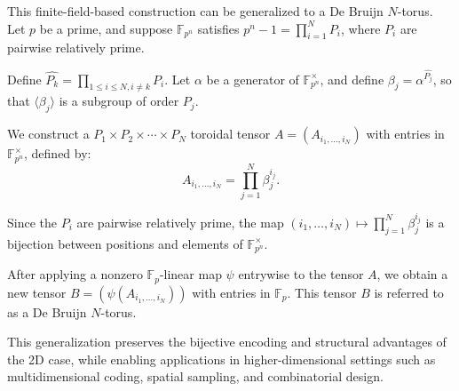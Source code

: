 \documentclass{article}
\begin{document}
This finite-field-based construction can be generalized to a De Bruijn $N$-torus. Let $p$ be a prime, and suppose $\mathbb{F}_{p^n}$ satisfies $p^n - 1 = \prod^{N}_{i=1} P_{i}$, where $P_{i}$ are pairwise relatively prime.

Define $\hat{P_k} = \prod_{1 \le i \le N, i \ne k} P_i$. Let $\alpha$ be a generator of $\mathbb{F}_{p^n}^\times$, and define $\beta_j = \alpha^{\hat{P_j}}$, so that $\langle \beta_j \rangle$ is a subgroup of order $P_j$.

We construct a $P_1 \times P_2 \times \cdots \times P_N$ toroidal tensor $A = (A_{i_1, \ldots, i_N})$ with entries in $\mathbb{F}_{p^n}^\times$, defined by:
\[
A_{i_1, \ldots, i_N} = \prod_{j=1}^{N} \beta_j^{i_j}.
\]

Since the $P_i$ are pairwise relatively prime, the map $ (i_1, \ldots, i_N) \mapsto \prod_{j=1}^{N} \beta_j^{i_j} $ is a bijection between positions and elements of $\mathbb{F}_{p^n}^\times$.

After applying a nonzero $\mathbb{F}_p$-linear map $\psi$ entrywise to the tensor $A$, we obtain a new tensor $B = (\psi(A_{i_1, \ldots, i_N}))$ with entries in $\mathbb{F}_p$. This tensor $B$ is referred to as a De Bruijn $N$-torus.

This generalization preserves the bijective encoding and structural advantages of the 2D case, while enabling applications in higher-dimensional settings such as multidimensional coding, spatial sampling, and combinatorial design.




\clearpage


 

\end{document}

